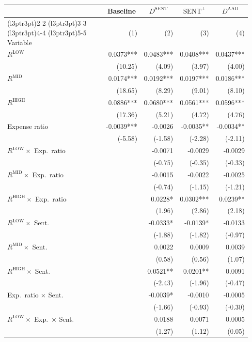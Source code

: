 \begin{table}[!htbp]
{\begin{tabular*}{\linewidth}{@{\extracolsep{\fill}}lrrrr}
\toprule
\multicolumn{1}{c}{ } & \multicolumn{1}{c}{Baseline} & \multicolumn{1}{c}{$D^{\text{SENT}}$} & \multicolumn{1}{c}{$\text{SENT}^\perp$} & \multicolumn{1}{c}{$D^{\text{AAII}}$} \\
\cmidrule(l{3pt}r{3pt}){2-2} \cmidrule(l{3pt}r{3pt}){3-3} \cmidrule(l{3pt}r{3pt}){4-4} \cmidrule(l{3pt}r{3pt}){5-5}
Variable & (1) & (2) & (3) & (4)\\
\midrule
$R^{\text{LOW}}$ & 0.0373*** & 0.0483*** & 0.0408*** & 0.0437***\\
 & (10.25) & (4.09) & (3.97) & (4.00)\\
$R^{\text{MID}}$ & 0.0174*** & 0.0192*** & 0.0197*** & 0.0186***\\
 & (18.65) & (8.29) & (9.01) & (8.10)\\
$R^{\text{HIGH}}$ & 0.0886*** & 0.0680*** & 0.0561*** & 0.0596***\\
 & (17.36) & (5.21) & (4.72) & (4.76)\\
Expense ratio & -0.0039*** & -0.0026 & -0.0035** & -0.0034**\\
 & (-5.58) & (-1.58) & (-2.28) & (-2.11)\\
$R^{\text{LOW}}\times$ Exp.\ ratio &  & -0.0071 & -0.0029 & -0.0029\\
 &  & (-0.75) & (-0.35) & (-0.33)\\
$R^{\text{MID}}\times$ Exp.\ ratio &  & -0.0015 & -0.0022 & -0.0025\\
 &  & (-0.74) & (-1.15) & (-1.21)\\
$R^{\text{HIGH}}\times$ Exp.\ ratio &  & 0.0228* & 0.0302*** & 0.0239**\\
 &  & (1.96) & (2.86) & (2.18)\\
$R^{\text{LOW}}\times$ Sent. &  & -0.0333* & -0.0139* & -0.0133\\
 &  & (-1.88) & (-1.82) & (-0.97)\\
$R^{\text{MID}}\times$ Sent. &  & 0.0022 & 0.0009 & 0.0039\\
 &  & (0.58) & (0.56) & (1.07)\\
$R^{\text{HIGH}}\times$ Sent. &  & -0.0521** & -0.0201** & -0.0091\\
 &  & (-2.43) & (-1.96) & (-0.47)\\
Exp.\ ratio $\times$ Sent. &  & -0.0039* & -0.0010 & -0.0005\\
 &  & (-1.66) & (-0.93) & (-0.30)\\
$R^{\text{LOW}}\times$ Exp.\ $\times$ Sent. &  & 0.0188 & 0.0071 & 0.0005\\
 &  & (1.27) & (1.12) & (0.05)\\

\end{tabular*}}
\end{table}
